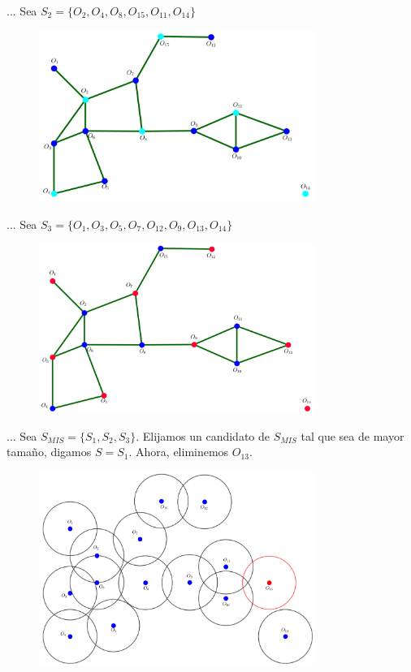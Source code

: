 \begin{frame}{...}
  Sea $S_2 = \{O_2, O_4, O_8, O_{15}, O_{11}, O_{14}\}$
  \begin{figure}  
    \centering
    \includegraphics[width=0.8\textwidth]{./Images/S2.png}
  \end{figure}
\end{frame}


\begin{frame}{...}
  Sea $S_3 = \{O_1, O_3, O_5, O_7, O_{12}, O_{9}, O_{13}, O_{14}\}$
  \begin{figure}  
    \centering
    \includegraphics[width=0.8\textwidth]{./Images/S3.png}
  \end{figure}
\end{frame}

\begin{frame}{...}
  Sea $S_{MIS} = \{S_1, S_2, S_3\}$. Elijamos un candidato de $S_{MIS}$ tal que sea de mayor tamaño,
  digamos $S = S_1$. Ahora, eliminemos $O_{13}$.
  \begin{figure}  
    \centering
    \includegraphics[width=0.8\textwidth]{./Images/03.png}
  \end{figure}
\end{frame}

